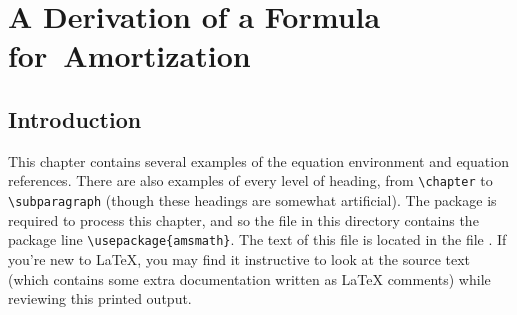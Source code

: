 
\newcommand\square{\vbox{\hrule{\hbox{\vrule height5pt\kern5pt\vrule}}\hrule}}
\newenvironment{finalsquare}%
  {\ifvmode\relax\else\par\fi\parfillskip=0pt}%
  {\linebreak[0]\hspace*{\fill}\square\par}


\chapter{A Derivation of a Formula for~Amortization}
\section{Introduction}
This chapter contains several examples of the equation environment and
equation references.  There are also examples of every level of
heading, from \verb|\chapter| to \verb|\subparagraph| (though these
headings are somewhat artificial).  The  package is required
to process this chapter, and so the  file in this
directory contains the package line \verb|\usepackage{amsmath}|.
The text of this file is located in the file .
If you're new to \LaTeX, you may find it instructive to look at the
source text (which contains some extra documentation written as
\LaTeX{} comments) while reviewing this printed output.

